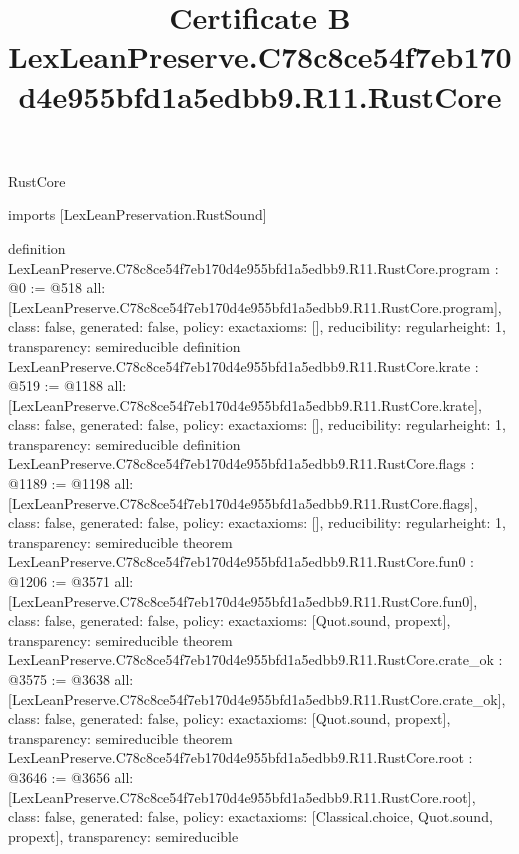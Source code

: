 \begin{lexlean}{RustCore}
\title{Certificate B LexLeanPreserve.C78c8ce54f7eb170d4e955bfd1a5edbb9.R11.RustCore}
\begin{coremodule}
imports [LexLeanPreservation.RustSound]

definition LexLeanPreserve.C78c8ce54f7eb170d4e955bfd1a5edbb9.R11.RustCore.program : @0 := @518 {
  all: [LexLeanPreserve.C78c8ce54f7eb170d4e955bfd1a5edbb9.R11.RustCore.program],
  class: false,
  generated: false,
  policy: exact{axioms: []},
  reducibility: regular{height: 1},
  transparency: semireducible
}
definition LexLeanPreserve.C78c8ce54f7eb170d4e955bfd1a5edbb9.R11.RustCore.krate : @519 := @1188 {
  all: [LexLeanPreserve.C78c8ce54f7eb170d4e955bfd1a5edbb9.R11.RustCore.krate],
  class: false,
  generated: false,
  policy: exact{axioms: []},
  reducibility: regular{height: 1},
  transparency: semireducible
}
definition LexLeanPreserve.C78c8ce54f7eb170d4e955bfd1a5edbb9.R11.RustCore.flags : @1189 := @1198 {
  all: [LexLeanPreserve.C78c8ce54f7eb170d4e955bfd1a5edbb9.R11.RustCore.flags],
  class: false,
  generated: false,
  policy: exact{axioms: []},
  reducibility: regular{height: 1},
  transparency: semireducible
}
theorem LexLeanPreserve.C78c8ce54f7eb170d4e955bfd1a5edbb9.R11.RustCore.fun0 : @1206 := @3571 {
  all: [LexLeanPreserve.C78c8ce54f7eb170d4e955bfd1a5edbb9.R11.RustCore.fun0],
  class: false,
  generated: false,
  policy: exact{axioms: [Quot.sound, propext]},
  transparency: semireducible
}
theorem LexLeanPreserve.C78c8ce54f7eb170d4e955bfd1a5edbb9.R11.RustCore.crate_ok : @3575 := @3638 {
  all: [LexLeanPreserve.C78c8ce54f7eb170d4e955bfd1a5edbb9.R11.RustCore.crate_ok],
  class: false,
  generated: false,
  policy: exact{axioms: [Quot.sound, propext]},
  transparency: semireducible
}
theorem LexLeanPreserve.C78c8ce54f7eb170d4e955bfd1a5edbb9.R11.RustCore.root : @3646 := @3656 {
  all: [LexLeanPreserve.C78c8ce54f7eb170d4e955bfd1a5edbb9.R11.RustCore.root],
  class: false,
  generated: false,
  policy: exact{axioms: [Classical.choice, Quot.sound, propext]},
  transparency: semireducible
}


\end{coremodule}
\end{lexlean}
